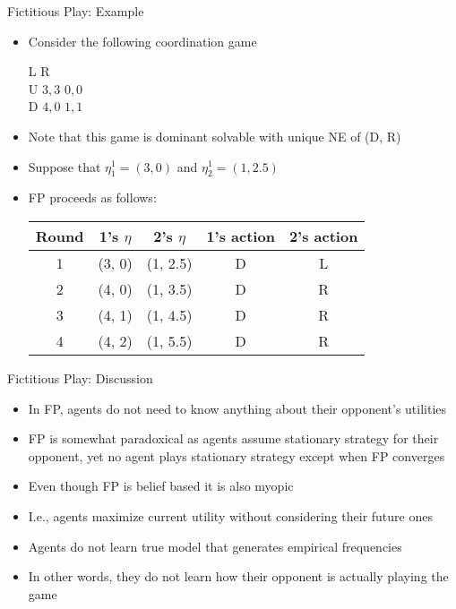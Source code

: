 \documentclass[11pt,aspectratio=169,handout]{beamer}
\begin{document}
  
  \begin{frame}{Fictitious Play: Example}
   \begin{itemize}[<+->]
    \item Consider the following coordination game
    \begin{center}\scriptsize
     \hspace{-3.5em}
     \begin{game}{2}{2}
      	\> L		\> R		\\
      U	\> $3,3$	\> $0,0$	\\
      D	\> $4,0$	\> $1,1$
     \end{game}
    \end{center}
    \vspace{1em}
    \item Note that this game is dominant solvable with unique NE of (D, R)
    \item Suppose that $\eta_1^1 = (3, 0)$ and $\eta_2^1 = (1, 2.5)$
    \item FP proceeds as follows:
    \vspace{1em}
    \begin{center}
     \begin{tabular}{ccccc}
      Round	& 1's $\eta$	& 2's $\eta$	& 1's action	& 2's action			\\ \hline
      1		& (3, 0)		& (1, 2.5) 	& D			& L			\pause	\\
      2		& (4, 0)		& (1, 3.5) 	& D			& R			\pause	\\
      3		& (4, 1)		& (1, 4.5) 	& D			& R			\pause	\\
      4		& (4, 2)		& (1, 5.5) 	& D			& R					\\
     \end{tabular}
    \end{center}
   \end{itemize}
  \end{frame}
  
  
  \begin{frame}{Fictitious Play: Discussion}
   \begin{itemize}[<+->]
   \setlength{\itemsep}{1.2em}
    \item In FP, agents \alert{do not} need to know anything about their opponent's utilities
    \item FP is somewhat paradoxical as agents assume stationary strategy for their opponent, yet no agent plays stationary strategy except when FP converges
    \item Even though FP is \alert{belief based} it is also \alert{myopic}
    \item I.e., agents maximize current utility without considering their future ones
    \item Agents do not learn \alert{true model} that generates empirical frequencies
    \item In other words, they do not learn how their opponent is actually playing the game
   \end{itemize}
  \end{frame}
  
\end{document}
